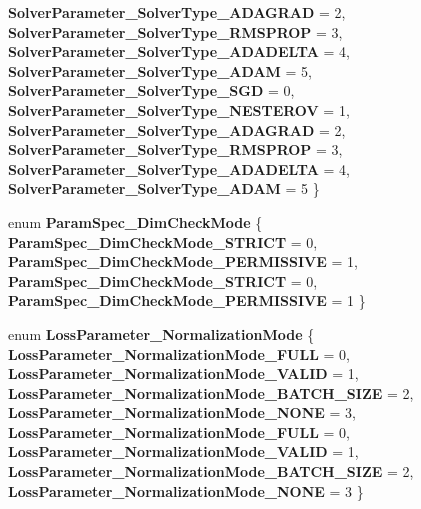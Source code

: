 \begin{DoxyCompactItemize}
{\bfseries Solver\+Parameter\+\_\+\+Solver\+Type\+\_\+\+A\+D\+A\+G\+R\+AD} = 2, 
{\bfseries Solver\+Parameter\+\_\+\+Solver\+Type\+\_\+\+R\+M\+S\+P\+R\+OP} = 3, 
\newline
{\bfseries Solver\+Parameter\+\_\+\+Solver\+Type\+\_\+\+A\+D\+A\+D\+E\+L\+TA} = 4, 
{\bfseries Solver\+Parameter\+\_\+\+Solver\+Type\+\_\+\+A\+D\+AM} = 5, 
{\bfseries Solver\+Parameter\+\_\+\+Solver\+Type\+\_\+\+S\+GD} = 0, 
{\bfseries Solver\+Parameter\+\_\+\+Solver\+Type\+\_\+\+N\+E\+S\+T\+E\+R\+OV} = 1, 
\newline
{\bfseries Solver\+Parameter\+\_\+\+Solver\+Type\+\_\+\+A\+D\+A\+G\+R\+AD} = 2, 
{\bfseries Solver\+Parameter\+\_\+\+Solver\+Type\+\_\+\+R\+M\+S\+P\+R\+OP} = 3, 
{\bfseries Solver\+Parameter\+\_\+\+Solver\+Type\+\_\+\+A\+D\+A\+D\+E\+L\+TA} = 4, 
{\bfseries Solver\+Parameter\+\_\+\+Solver\+Type\+\_\+\+A\+D\+AM} = 5
 \}
\item 
\mbox{\label{namespacecaffe_a2636d2f307d34114fc237f3b126b8621}} 
enum {\bfseries Param\+Spec\+\_\+\+Dim\+Check\+Mode} \{ {\bfseries Param\+Spec\+\_\+\+Dim\+Check\+Mode\+\_\+\+S\+T\+R\+I\+CT} = 0, 
{\bfseries Param\+Spec\+\_\+\+Dim\+Check\+Mode\+\_\+\+P\+E\+R\+M\+I\+S\+S\+I\+VE} = 1, 
{\bfseries Param\+Spec\+\_\+\+Dim\+Check\+Mode\+\_\+\+S\+T\+R\+I\+CT} = 0, 
{\bfseries Param\+Spec\+\_\+\+Dim\+Check\+Mode\+\_\+\+P\+E\+R\+M\+I\+S\+S\+I\+VE} = 1
 \}
\item 
\mbox{\label{namespacecaffe_a8a23c4d583bae44f37cde544258f64f1}} 
enum {\bfseries Loss\+Parameter\+\_\+\+Normalization\+Mode} \{ \newline
{\bfseries Loss\+Parameter\+\_\+\+Normalization\+Mode\+\_\+\+F\+U\+LL} = 0, 
{\bfseries Loss\+Parameter\+\_\+\+Normalization\+Mode\+\_\+\+V\+A\+L\+ID} = 1, 
{\bfseries Loss\+Parameter\+\_\+\+Normalization\+Mode\+\_\+\+B\+A\+T\+C\+H\+\_\+\+S\+I\+ZE} = 2, 
{\bfseries Loss\+Parameter\+\_\+\+Normalization\+Mode\+\_\+\+N\+O\+NE} = 3, 
\newline
{\bfseries Loss\+Parameter\+\_\+\+Normalization\+Mode\+\_\+\+F\+U\+LL} = 0, 
{\bfseries Loss\+Parameter\+\_\+\+Normalization\+Mode\+\_\+\+V\+A\+L\+ID} = 1, 
{\bfseries Loss\+Parameter\+\_\+\+Normalization\+Mode\+\_\+\+B\+A\+T\+C\+H\+\_\+\+S\+I\+ZE} = 2, 
{\bfseries Loss\+Parameter\+\_\+\+Normalization\+Mode\+\_\+\+N\+O\+NE} = 3
 \}
\item 
\mbox{\label{namespacecaffe_a145aa96a13113269aa86ea0bdf704348}} 

\end{DoxyCompactItemize}
